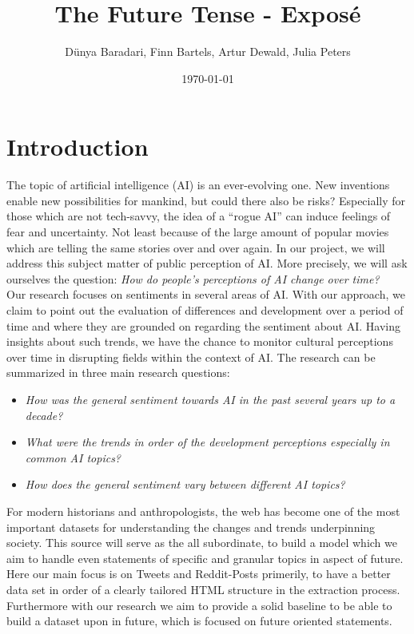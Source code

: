\documentclass[11pt]{article}
\title{The Future Tense - Exposé}
\author{Dünya Baradari, Finn Bartels, Artur Dewald, Julia Peters}
\date{\today}
\begin{document}
\maketitle
\thispagestyle{empty}


\section{Introduction}
The topic of artificial intelligence (AI) is an ever-evolving one.
New inventions enable new possibilities for mankind, but could there also be risks?
Especially for those which are not tech-savvy, the idea of a “rogue AI” can induce feelings of fear and uncertainty.
Not least because of the large amount of popular movies which are telling the same stories over and over again.
In our project, we will address this subject matter of public perception of AI.
More precisely, we will ask ourselves the question:
\textit{How do people’s perceptions of AI change over time?}
\\
Our research focuses on sentiments in several areas of AI.
With our approach, we claim to point out the evaluation of differences and development over a period of time and where they are grounded on regarding the sentiment about AI.
Having insights about such trends, we have the chance to monitor cultural perceptions over time in disrupting fields within the context of AI.
The research can be summarized in three main research questions:

\begin{itemize}
\item \textit{How was the general sentiment towards AI in the past several years up to a decade?}
\item \textit{What were the trends in order of the development perceptions especially in common AI topics?}
\item \textit{How does the general sentiment vary between different AI topics?}
\end{itemize}
%
For modern historians and anthropologists, the web has become one of the most important datasets for understanding the changes and trends underpinning society.
This source will serve as the all subordinate, to build a model which we aim to handle even statements of specific and granular topics in aspect of future.
Here our main focus is on Tweets and Reddit-Posts primerily, to have a better data set in order of a clearly tailored HTML structure in the extraction process.
Furthermore with our research we aim to provide a solid baseline to be able to build a dataset upon in future, which is focused on future oriented statements.
\end{document}
